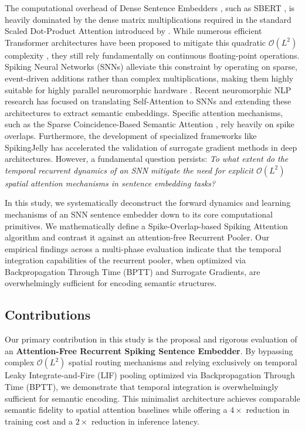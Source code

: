 \documentclass[final]{clv2025}
\begin{document}
The computational overhead of Dense Sentence Embedders \citep{devlin2018bert}, such as SBERT \citep{reimers2019sentence}, is heavily dominated by the dense matrix multiplications required in the standard Scaled Dot-Product Attention introduced by \citet{vaswani2017attention}. While numerous efficient Transformer architectures have been proposed to mitigate this quadratic $\mathcal{O}(L^2)$ complexity \citep{tay2022efficient}, they still rely fundamentally on continuous floating-point operations. Spiking Neural Networks (SNNs) alleviate this constraint by operating on sparse, event-driven additions rather than complex multiplications, making them highly suitable for highly parallel neuromorphic hardware \citep{roy2019towards}. Recent neuromorphic NLP research has focused on translating Self-Attention to SNNs \citep{li2022spikeformer, zhu2023spikegpt} and extending these architectures to extract semantic embeddings. Specific attention mechanisms, such as the Sparse Coincidence-Based Semantic Attention \citep{coincidence2026}, rely heavily on spike overlaps. Furthermore, the development of specialized frameworks like SpikingJelly \citep{fang2023spikingjelly} has accelerated the validation of surrogate gradient methods in deep architectures. However, a fundamental question persists: \textit{To what extent do the temporal recurrent dynamics of an SNN mitigate the need for explicit $\mathcal{O}(L^2)$ spatial attention mechanisms in sentence embedding tasks?}

In this study, we systematically deconstruct the forward dynamics and learning mechanisms of an SNN sentence embedder down to its core computational primitives. We mathematically define a Spike-Overlap-based Spiking Attention algorithm and contrast it against an attention-free Recurrent Pooler. Our empirical findings across a multi-phase evaluation indicate that the temporal integration capabilities of the recurrent pooler, when optimized via Backpropagation Through Time (BPTT) and Surrogate Gradients, are overwhelmingly sufficient for encoding semantic structures.

\subsection*{Contributions}
Our primary contribution in this study is the proposal and rigorous evaluation of an \textbf{Attention-Free Recurrent Spiking Sentence Embedder}. By bypassing complex $\mathcal{O}(L^2)$ spatial routing mechanisms and relying exclusively on temporal Leaky Integrate-and-Fire (LIF) pooling optimized via Backpropagation Through Time (BPTT), we demonstrate that temporal integration is overwhelmingly sufficient for semantic encoding. This minimalist architecture achieves comparable semantic fidelity to spatial attention baselines while offering a $4\times$ reduction in training cost and a $2\times$ reduction in inference latency. 
\end{document}
